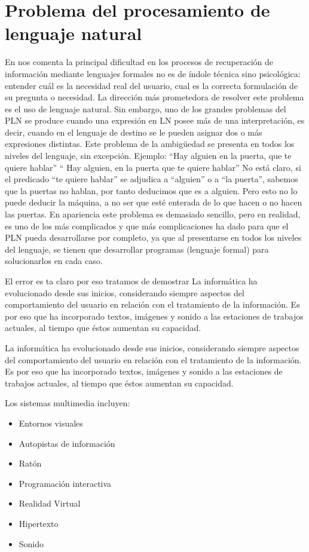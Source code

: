 \section{Problema del procesamiento de lenguaje natural}

En \cite{Arquitectura} nos comenta  la principal dificultad en los procesos de recuperación
de información mediante lenguajes formales no es de índole técnica sino psicológica: entender cuál es la necesidad real del usuario, cual es la correcta formulación de su pregunta o necesidad. La dirección más prometedora de resolver este problema es el uso de lenguaje natural. Sin embargo, uno de los grandes problemas del PLN se produce cuando una expresión en LN posee más de una interpretación, es decir, cuando en el lenguaje de destino se le pueden asignar dos o más expresiones distintas. Este problema de la ambigüedad se presenta en todos los niveles del lenguaje, sin excepción. Ejemplo:
“Hay alguien en la puerta, que te quiere hablar”
“ Hay alguien, en la puerta que te quiere hablar”
No está claro, si el predicado “te quiere hablar” se adjudica a “alguien” o a “la puerta”, sabemos que la puertas no hablan, por tanto deducimos que es a alguien. Pero 
esto no lo puede deducir la máquina, a no ser que esté enterada de lo que hacen o no hacen las puertas. En apariencia este problema es demasiado sencillo, pero en realidad, es uno de los más complicados y que más complicaciones ha dado para que el PLN pueda desarrollarse por completo, ya que al presentarse en todos los niveles del lenguaje, se tienen que desarrollar programas (lenguaje formal) para solucionarlos en cada caso.

El error es ta claro por eso tratamos de demostrar La informática ha evolucionado desde sus inicios, considerando siempre aspectos del comportamiento del usuario en relación con el tratamiento de la información. Es por eso que ha incorporado textos, imágenes y
sonido a las estaciones de trabajos actuales, al tiempo que éstos aumentan su capacidad.

La informática ha evolucionado desde sus inicios, considerando siempre aspectos del comportamiento del usuario en relación con el tratamiento de la información. Es por eso que ha incorporado textos, imágenes y sonido a las estaciones de trabajos actuales, al tiempo que éstos aumentan su capacidad.

Los sistemas multimedia incluyen:
\begin{itemize}
  \item Entornos visuales
  \item Autopistas de información
  \item Ratón
  \item Programación interactiva
  \item Realidad Virtual
  \item Hipertexto
  \item Sonido
\end{itemize}
 
